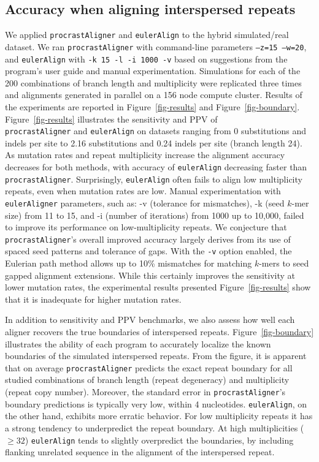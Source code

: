 \documentclass{llncs}
\begin{document}
\subsection{Accuracy when aligning interspersed repeats}
We applied \texttt{procrastAligner} and \texttt{eulerAlign} to the
hybrid simulated/real dataset.  We ran \texttt{procrastAligner}
with command-line parameters \texttt{--z=15 --w=20}, and
\texttt{eulerAlign} with \texttt{-k 15 -l -i 1000 -v} based on suggestions
from the program's user guide and manual experimentation.
Simulations for each of the 200 combinations of branch length and
multiplicity were replicated three times and alignments generated in
parallel on a 156 node compute cluster.  Results of the experiments
are reported in Figure~\ref{fig-results} and
Figure~\ref{fig-boundary}. Figure~\ref{fig-results} illustrates the
sensitivity and PPV of \\
\texttt{procrastAligner} and
\texttt{eulerAlign} on datasets ranging from 0 substitutions and
indels per site to 2.16 substitutions and 0.24 indels per site (branch length 24).  As
mutation rates and repeat multiplicity increase the alignment accuracy
decreases for both methods, with accuracy of \texttt{eulerAlign}
decreasing faster than \texttt{procrastAligner}.  Surprisingly, \texttt{eulerAlign}
often fails to align low multiplicity repeats, even when mutation rates are low.
Manual experimentation with \texttt{eulerAligner} parameters, such as: -v (tolerance for mismatches), -k (seed $k$-mer size) from 11 to 15, and -i (number of iterations) from 1000 up to 10,000, failed to improve its performance on low-multiplicity repeats.
We conjecture that \texttt{procrastAligner}'s overall improved accuracy largely derives
from its use of spaced seed patterns\cite{ref-procrast} and tolerance
of gaps. With the \texttt{-v} option enabled, the Eulerian path method allows up to 10\% mismatches for matching $k$-mers to seed gapped alignment extensions. While this certainly improves the sensitivity at lower mutation rates, the experimental results presented Figure~\ref{fig-results} show that it is inadequate for higher mutation rates.

In addition to sensitivity and PPV benchmarks, we also assess how well
each aligner recovers the true boundaries of interspersed
repeats.  Figure~\ref{fig-boundary} illustrates the ability of each
program to accurately localize the known boundaries of the simulated interspersed
repeats. From the figure, it is apparent that on average \texttt{procrastAligner} predicts
the exact repeat boundary for all studied combinations of branch length (repeat degeneracy)
and multiplicity (repeat copy number).  Moreover, the standard error in \texttt{procrastAligner}'s
boundary predictions is typically very low, within 4 nucleotides.  \texttt{eulerAlign}, on the other hand,
exhibits more erratic behavior.  For low multiplicity repeats it has a strong tendency to
underpredict the repeat boundary.  At high multiplicities ($\geq32$) \texttt{eulerAlign} tends to
slightly overpredict the boundaries, by including flanking unrelated sequence in the alignment of
the interspersed repeat.
\end{document}
